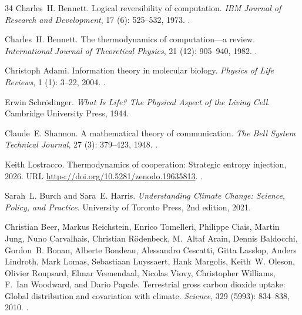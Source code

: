 \documentclass[11pt]{article}
\theoremstyle{plain}
\theoremstyle{definition}
\theoremstyle{remark}
\begin{document}
\begin{thebibliography}{34}
Charles~H. Bennett.
\newblock Logical reversibility of computation.
\newblock \emph{IBM Journal of Research and Development}, 17
  (6): 525--532, 1973.
\newblock {}.

Charles~H. Bennett.
\newblock The thermodynamics of computation---a review.
\newblock \emph{International Journal of Theoretical Physics}, 21
  (12): 905--940, 1982.
\newblock {}.

Christoph Adami.
\newblock Information theory in molecular biology.
\newblock \emph{Physics of Life Reviews}, 1 (1): 3--22, 2004.
\newblock {}.

Erwin Schr{\"o}dinger.
\newblock \emph{What Is Life? The Physical Aspect of the Living Cell}.
\newblock Cambridge University Press, 1944.

Claude~E. Shannon.
\newblock A mathematical theory of communication.
\newblock \emph{The Bell System Technical Journal}, 27 (3):
  379--423, 1948.
\newblock {}.

Keith Lostracco.
\newblock Thermodynamics of cooperation: Strategic entropy injection,
  2026{}.
\newblock URL \url{https://doi.org/10.5281/zenodo.19635813}.
\newblock {}.

Sarah~L. Burch and Sara~E. Harris.
\newblock \emph{Understanding Climate Change: Science, Policy, and Practice}.
\newblock University of Toronto Press, 2nd edition, 2021.

Christian Beer, Markus Reichstein, Enrico Tomelleri, Philippe Ciais, Martin
  Jung, Nuno Carvalhais, Christian R{\"o}denbeck, M.~Altaf Arain, Dennis
  Baldocchi, Gordon~B. Bonan, Alberte Bondeau, Alessandro Cescatti, Gitta
  Lasslop, Anders Lindroth, Mark Lomas, Sebastiaan Luyssaert, Hank Margolis,
  Keith~W. Oleson, Olivier Roupsard, Elmar Veenendaal, Nicolas Viovy,
  Christopher Williams, F.~Ian Woodward, and Dario Papale.
\newblock Terrestrial gross carbon dioxide uptake: Global distribution and
  covariation with climate.
\newblock \emph{Science}, 329 (5993): 834--838, 2010.
\newblock {}.


\end{thebibliography}
\end{document}
